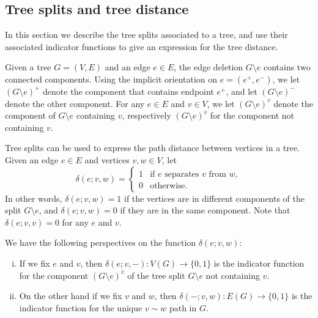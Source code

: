 \documentclass{amsart}
\theoremstyle{definition}
\begin{document}
\subsection{Tree splits and tree distance}
\label{sec:tree-splits}

In this section we describe the tree splits associated to a tree, and use their associated indicator functions to give an expression for the tree distance.

Given a tree $G = (V,E)$ and an edge $e \in E$, the edge deletion $G \setminus e$ contains two connected components.
Using the implicit orientation on $e = (e^+,e^-)$,
we let $(G \setminus e)^+$ denote the component that contains endpoint $e^+$, and let $(G\setminus e)^-$ denote the other component.
For any $e \in E$ and $v \in V$,
we let
$(G \setminus e)^{v}$ denote the component of $G\setminus e$ containing $v$,
respectively $(G\setminus e)^{\overline v}$ for the component not containing $v$.


Tree splits can be used to express the path distance between vertices in a tree.
Given an edge $e\in E$ and vertices $v,w \in V$, let 
\begin{equation}
\delta(e;v,w) = \begin{cases}
	1 &\text{if $e$ separates  $v$ from $w$}, \\
	0 &\text{otherwise}.
\end{cases}
\end{equation}
In other words, $\delta(e; v,w) = 1$ if the vertices are in different components of the split $G \setminus e$,
and $\delta(e; v,w) = 0$ if they are in the same component.
Note that $\delta(e; v,v) = 0$ for any $e$ and $v$.

We have the following perspectives on the function $\delta(e; v,w)$:
\begin{enumerate}[(i)]
\item 
If we fix $e$ and $v$,
then $\delta(e;v, -) : V(G) \to \{0,1\}$ 
is the indicator function for the component 
$(G \setminus e)^{\overline v}$ of the tree split $G \setminus e$
not containing $v$.

\item 
On the other hand if we fix $v$ and $w$, then $\delta(-;v,w) : E(G) \to \{0,1\}$
is the indicator function for the unique $v \sim w$ path in $G$.

\end{enumerate}
\end{document}
